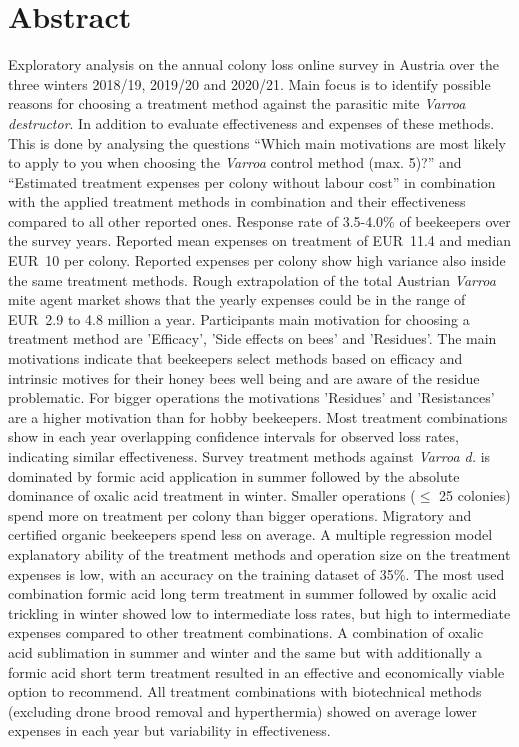 \chapter*{Abstract}
\label{sec:abstract}
\vspace*{-15mm}

Exploratory analysis on the annual colony loss online survey in Austria over the three winters 2018/19, 2019/20 and 2020/21. Main focus is to identify possible reasons for choosing a treatment method against the parasitic mite \textit{Varroa destructor}. In addition to evaluate effectiveness and expenses of these methods. This is done by analysing the questions \enquote{Which main motivations are most likely to apply to you when choosing the \textit{Varroa} control method (max. 5)?} and \enquote{Estimated treatment expenses per colony without labour cost} in combination with the applied treatment methods in combination and their effectiveness compared to all other reported ones. Response rate of 3.5-4.0\% of beekeepers over the survey years. Reported mean expenses on treatment of EUR~11.4 and median EUR~10 per colony. Reported expenses per colony show high variance also inside the same treatment methods. Rough extrapolation of the total Austrian \textit{Varroa} mite agent market shows that the yearly expenses could be in the range of EUR~2.9 to 4.8 million a year. Participants main motivation for choosing a treatment method are 'Efficacy', 'Side effects on bees' and 'Residues'. The main motivations indicate that beekeepers select methods based on efficacy and intrinsic motives for their honey bees well being and are aware of the residue problematic. For bigger operations the motivations 'Residues' and 'Resistances' are a higher motivation than for hobby beekeepers. Most treatment combinations show in each year overlapping confidence intervals for observed loss rates, indicating similar effectiveness. Survey treatment methods against \textit{Varroa d.} is dominated by formic acid application in summer followed by the absolute dominance of oxalic acid treatment in winter. Smaller operations ($\leq$ 25 colonies) spend more on treatment per colony than bigger operations. Migratory and certified organic beekeepers spend less on average. A multiple regression model explanatory ability of the treatment methods and operation size on the treatment expenses is low, with an accuracy on the training dataset of 35\%. The most used combination formic acid long term treatment in summer followed by oxalic acid trickling in winter showed low to intermediate loss rates, but high to intermediate expenses compared to other treatment combinations. A combination of oxalic acid sublimation in summer and winter and the same but with additionally a formic acid short term treatment resulted in an effective and economically viable option to recommend. All treatment combinations with biotechnical methods (excluding drone brood removal and hyperthermia) showed on average lower expenses in each year but variability in effectiveness.
